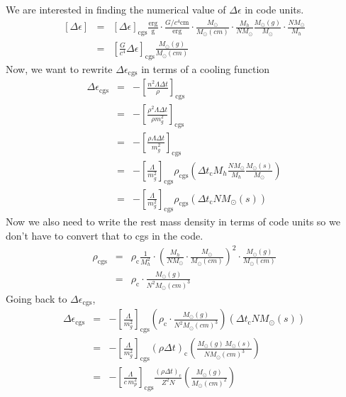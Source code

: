 We are interested in finding the numerical value of $\Delta \epsilon$ in code units.
\begin{subequations}
\begin{eqnarray}
	\left[\Delta \epsilon \right] &=& \left[ \Delta \epsilon \right]_\mathrm{cgs} \mathrm{\frac{erg}{g}} \cdot
		\frac{G/c^4 \mathrm{cm}}{\mathrm{erg}} \cdot \frac{M_\odot}{M_\odot(cm)} \cdot \frac{M_h}{N M_\odot}
		\frac{M_\odot(g)}{M_\odot} \cdot \frac{N M_\odot}{M_h} \\
	&=& \left[ \frac{G}{c^4} \Delta \epsilon \right]_\mathrm{cgs} \frac{M_\odot(g)}{M_\odot(cm)}
\end{eqnarray}
\end{subequations}
Now, we want to rewrite $\Delta \epsilon_\mathrm{cgs}$ in terms of a cooling function 
\begin{subequations}
\begin{eqnarray}
	\Delta\epsilon_\mathrm{cgs} &=& - \left[ \frac{n^2 \Lambda \Delta t}{\rho} \right]_\mathrm{cgs}\\
	&=& - \left[ \frac{\rho^2 \Lambda \Delta t}{\rho m_g^2} \right]_\mathrm{cgs}\\
	&=& - \left[ \frac{\rho \Lambda \Delta t}{m_g^2} \right]_\mathrm{cgs}\\
	&=& - \left[ \frac{\Lambda}{m_g^2} \right]_\mathrm{cgs} \rho_\mathrm{cgs} 
		\left( \Delta t_\mathrm{c} M_h \frac{N M_\odot}{M_h} \frac{M_\odot(s)}{M_\odot} \right) \\
	&=& - \left[ \frac{\Lambda}{m_g^2} \right]_\mathrm{cgs} \rho_\mathrm{cgs} 
		\left( \Delta t_\mathrm{c} N M_\odot(s) \right)
\end{eqnarray}
\end{subequations}
Now we also need to write the rest mass density in terms of code units so we don't have to convert that to cgs in the code.
\begin{subequations}
\begin{eqnarray}
	\rho_\mathrm{cgs} &=& \rho_\mathrm{c} \frac{1}{M_h^2} \cdot 
		\left( \frac{M_h}{N M_\odot} \cdot \frac{M_\odot}{M_\odot(cm)} \right)^2 
		\cdot \frac{M_\odot(g)}{M_\odot(cm)} \\
	&=& \rho_\mathrm{c} \cdot \frac{ M_\odot(g) }{ N^2 M_\odot(cm)^3 }
\end{eqnarray}
\end{subequations}
Going back to $\Delta \epsilon_\mathrm{cgs}$,
\begin{subequations}
\begin{eqnarray}
	\Delta\epsilon_\mathrm{cgs} &=& - \left[ \frac{\Lambda}{m_g^2} \right]_\mathrm{cgs} 
		\left( \rho_\mathrm{c} \cdot \frac{ M_\odot(g) }{ N^2 M_\odot(cm)^3 } \right)
		\left( \Delta t_\mathrm{c} N M_\odot(s) \right) \\
	&=& - \left[ \frac{\Lambda}{m_g^2} \right]_\mathrm{cgs} \left( \rho \Delta t \right)_\mathrm{c}
		\left( \frac{M_\odot(g)\, M_\odot(s)}{N M_\odot(cm)^3} \right) \\
	&=& - \left[ \frac{\Lambda}{c\,m_p^2} \right]_\mathrm{cgs} \frac{\left( \rho \Delta t \right)_\mathrm{c}}{Z^2 N}
		\left( \frac{M_\odot(g)}{M_\odot(cm)^2} \right)
\end{eqnarray}
\end{subequations}
